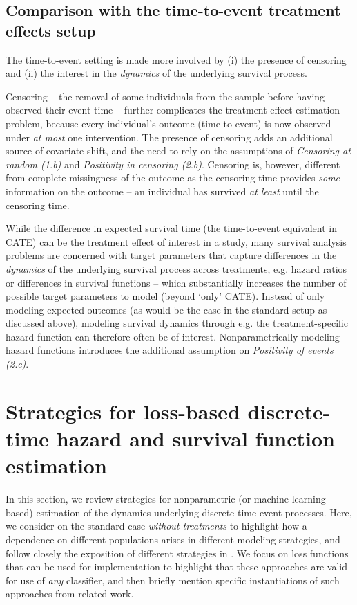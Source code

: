 \documentclass{article}
\begin{document}
\subsection{Comparison with the time-to-event treatment effects setup}
The time-to-event setting is made more involved by (i) the presence of censoring and (ii) the interest in the \textit{dynamics} of the underlying survival process.

Censoring -- the removal of some individuals from the sample before having observed their event time -- further complicates the treatment effect estimation problem, because every individual's outcome (time-to-event) is now observed under \textit{at most} one intervention. The presence of censoring adds an additional source of covariate shift, and the need to rely on the assumptions of \textit{Censoring at random (1.b)} and \textit{Positivity in censoring (2.b)}. Censoring is, however,  different from complete missingness of the outcome as the censoring time provides \textit{some} information on the outcome -- an individual has survived \textit{at least} until the censoring time. 

While the difference in expected survival time (the time-to-event equivalent in CATE) can be the treatment effect of interest in a study, many survival analysis problems are concerned with target parameters that capture differences in the \textit{dynamics} of the underlying survival process across treatments, e.g. hazard ratios or differences in survival functions -- which substantially increases the number of possible target parameters to model (beyond `only' CATE). Instead of only modeling expected outcomes (as would be the case in the standard setup as discussed above), modeling survival dynamics through e.g. the treatment-specific hazard function can therefore  often be of interest. Nonparametrically modeling hazard functions introduces the additional assumption on \textit{Positivity of events (2.c)}.
\section{Strategies for loss-based discrete-time hazard and survival function estimation} \newnumbering


In this section, we review strategies for nonparametric (or machine-learning based) estimation of the dynamics underlying discrete-time event processes. Here, we consider on the standard case \textit{without treatments} to highlight how a dependence on different populations arises in different modeling strategies, and follow closely the exposition of different strategies in \cite{kvamme2019continuous}. We focus on loss functions that can be used for implementation to highlight that these approaches are valid for use of \textit{any} classifier, and then briefly mention specific instantiations of such approaches from related work. 
\end{document}
